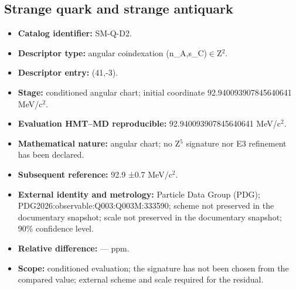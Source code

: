 \subsection{Strange quark and strange antiquark}
\begin{itemize}
\item \textbf{Catalog identifier:} SM-Q-D2.
\item \textbf{Descriptor type:} angular coindexation (n\_A,s\_C)\(\in\)Z\({}^{2}\).
\item \textbf{Descriptor entry:} (41,-3).
\item \textbf{Stage:} conditioned angular chart; initial coordinate 92.940093\allowbreak{}907845\allowbreak{}640641 MeV/c\({}^{2}\).
\item \textbf{Evaluation HMT--MD reproducible:} 92.940093\allowbreak{}907845\allowbreak{}640641 MeV/c\({}^{2}\).
\item \textbf{Mathematical nature:} angular chart; no Z\({}^{5}\) signature nor E3 refinement has been declared.
\item \textbf{Subsequent reference:} 92.9 ±\allowbreak{}0.7 MeV/c\({}^{2}\).
\item \textbf{External identity and metrology:} Particle Data Group (PDG); PDG2026:\allowbreak{}observable:\allowbreak{}Q003:\allowbreak{}Q003M:\allowbreak{}333590; scheme not preserved in the documentary snapshot; scale not preserved in the documentary snapshot; 90\% confidence level.
\item \textbf{Relative difference:} --- ppm.
\item \textbf{Scope:} conditioned evaluation; the signature has not been chosen from the compared value; external scheme and scale required for the residual.
\end{itemize}
